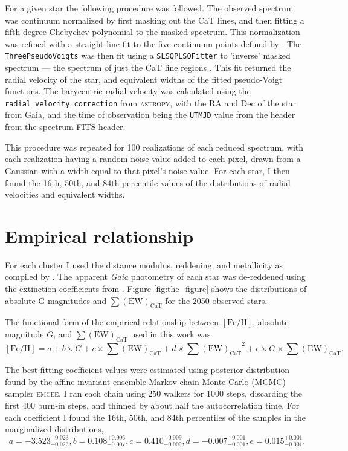\documentclass[RNAAS]{aastex63}
\newcommand{\feh}{\ensuremath{[\textrm{Fe}/\textrm{H}]}\xspace}
\newcommand{\sumcat}{\ensuremath{\sum{(\mathrm{EW})_\mathrm{CaT}}}\xspace}
\newcommand{\gaia}{\textit{Gaia}\xspace}
\begin{document}
For a given star the following procedure was followed. The observed spectrum was continuum normalized by first masking out the CaT lines, and then fitting a fifth-degree Chebychev polynomial to the masked spectrum. This normalization was refined with a straight line fit to the five continuum points defined by \citet{Carrera2013}. The \texttt{ThreePseudoVoigts} was then fit using a \texttt{SLSQPLSQFitter} to 'inverse' masked spectrum --- the spectrum of just the CaT line regions \citep[defined by][]{Carrera2013}. This fit returned the radial velocity of the star, and equivalent widths of the fitted pseudo-Voigt functions. The barycentric radial velocity was calculated using the \texttt{radial\_velocity\_correction} from \textsc{astropy}, with the RA and Dec of the star from Gaia, and the time of observation being the \texttt{UTMJD} value from the header from the spectrum FITS header.

This procedure was repeated for 100 realizations of each reduced spectrum, with each realization having a random noise value added to each pixel, drawn from a Gaussian with a width equal to that pixel's noise value. For each star, I then found the 16th, 50th, and 84th percentile values of the distributions of radial velocities and equivalent widths.

\section{Empirical relationship}
For each cluster I used the distance modulus, reddening, and metallicity as compiled by \citet{Usher2019}. The apparent \gaia photometry of each star was de-reddened using the extinction coefficients from \citet{GaiaCollaboration2018b}. Figure \ref{fig:the_figure} shows the distributions of absolute G magnitudes and \sumcat for the 2050 observed stars.

The functional form of the empirical relationship between \feh, absolute magnitude $G$, and \sumcat used in this work was
\begin{equation}\label{eq:fit}
	\feh = a + b\times G + c\times\sumcat + d\times\sumcat^2 + e\times G\times\sumcat.
\end{equation}

The best fitting coefficient values were estimated using posterior distribution found by the affine invariant ensemble Markov chain Monte Carlo (MCMC) sampler \textsc{emcee}. I ran each chain using 250 walkers for 1000 steps, discarding the first 400 burn-in steps, and thinned by about half the autocorrelation time. For each coefficient I found the 16th, 50th, and 84th percentiles of the samples in the marginalized distributions,
\begin{equation}
	a=-3.523_{-0.023}^{+0.023}, b=0.108_{-0.007}^{+0.006}, c=0.410_{-0.009}^{+0.009}, d=-0.007_{-0.001}^{+0.001},e=0.015_{-0.001}^{+0.001}.
\end{equation}
\end{document}
